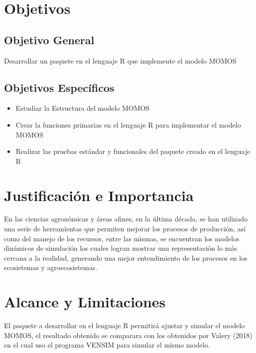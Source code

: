 \section{Objetivos}

\subsection{Objetivo General}
Desarrollar un paquete en el lenguaje R que implemente el modelo MOMOS


\subsection{Objetivos Espec\'ificos}

\begin{itemize}
\item Estudiar la Estructura del modelo MOMOS\\
\item Crear la funciones primarias en el lenguaje R para implementar el modelo MOMOS\\
\item Realizar las pruebas estándar y funcionales del paquete creado en el lenguaje R\\
\end{itemize}

\section{Justificaci\'on e Importancia}

En las ciencias agronómicas y áreas afines, en la última década, se han utilizado una serie de herramientas que permiten mejorar los procesos de producción, así como del manejo de los recursos, entre las mismas, se encuentran los modelos dinámicos de simulación los cuales logran mostrar una representación lo más cercana a la realidad, generando una mejor entendimiento de los procesos en los ecosistemas y agroecosistemas. \\

\section{Alcance y Limitaciones}

El paquete a desarrollar en el lenguaje R permitirá ajustar y simular el modelo MOMOS, el resultado obtenido se comparara con los obtenidos por Valery (2018) en el cual uso el programa VENSIM para simular el mismo modelo. \\
